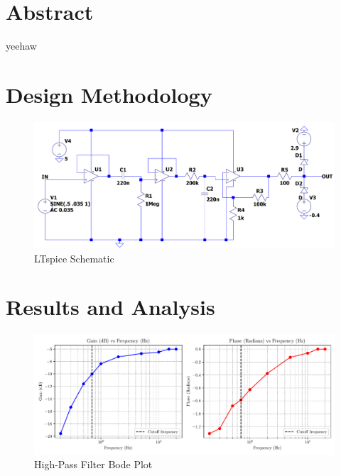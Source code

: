 \documentclass[CMPE]{KGCOEReport}
\begin{document}
\maketitle

\section*{Abstract}

yeehaw

\section*{Design Methodology}

\begin{figure}[H]
    \centering
    \includegraphics[width=1\textwidth]{LTspiceSchematic.png}
    \caption{LTspice Schematic}
    \label{fig:ltspiceSchematic}
\end{figure}

\section*{Results and Analysis}

\begin{figure}[H]
    \centering
    \includegraphics[width=1\textwidth]{high_pass_plot.pdf}
    \caption{High-Pass Filter Bode Plot}
    \label{fig:highPassBode}
\end{figure}
\end{document}
